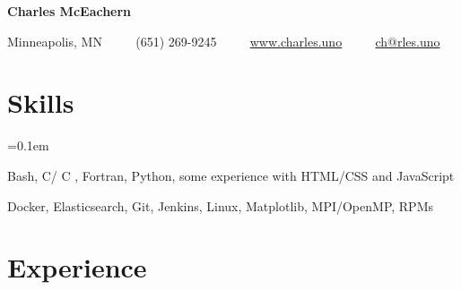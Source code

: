 \documentclass[11pt,letterpaper]{article}
\newcommand{\ResumeSection}[1]{
    \section*{ {\color{MidnightBlue}#1 \sout{\hfill} } }
}
\newcommand{\URL}[1]{\href{#1}{#1}\xspace}
\newcommand{\CPP}{
    C\nolinebreak[4]\hspace{-.05em}\raisebox{.22ex}{\footnotesize\bf ++}\xspace
}
\begin{document}


\begin{center}
    { \Huge \textbf{Charles McEachern} }

    \vspace{7pt}

    Minneapolis, MN
    \ \ \textbullet
    \ \ (651) 269-9245
    \ \ \textbullet
    \ \ \URL{www.charles.uno}
    \ \ \textbullet
    \ \ \href{mailto:ch@rles.uno}{ch@rles.uno}

    \vspace{3pt}

\end{center}


\ResumeSection{Skills}

\begin{description}[leftmargin=!, labelindent=\parindent,
                    labelwidth=\widthof{\bfseries Languages}]
    \parskip=0.1em

    \item[Languages]
        Bash, C/\CPP, Fortran, Python, some experience with HTML/CSS and JavaScript

    \item[Tools]
        Docker, Elasticsearch, Git, Jenkins, Linux, Matplotlib, MPI/OpenMP, RPMs

\end{description}



\ResumeSection{Experience}
\end{document}
